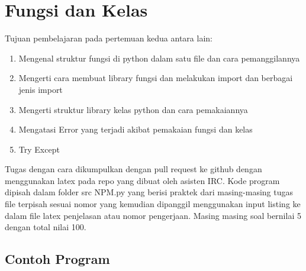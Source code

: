 \chapter{Fungsi dan Kelas}
Tujuan pembelajaran pada pertemuan kedua antara lain:
\begin{enumerate}
\item
Mengenal struktur fungsi di python dalam satu file dan cara pemanggilannya
\item
Mengerti cara membuat library fungsi dan melakukan import dan berbagai jenis import
\item
Mengerti struktur library kelas python dan cara pemakaiannya
\item
Mengatasi Error yang terjadi akibat pemakaian fungsi dan kelas
\item
Try Except
\end{enumerate}
Tugas dengan cara dikumpulkan dengan pull request ke github dengan menggunakan latex pada repo yang dibuat oleh asisten IRC. Kode program dipisah dalam folder src NPM.py yang berisi praktek dari masing-masing tugas file terpisah sesuai nomor yang kemudian dipanggil menggunakan input listing ke dalam file latex penjelasan atau nomor pengerjaan. Masing masing soal bernilai 5 dengan total nilai 100.

\section{Contoh Program}
